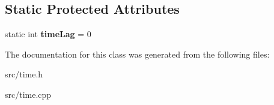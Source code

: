 \subsection*{Static Protected Attributes}
\begin{DoxyCompactItemize}
\item 
\hypertarget{classstb_1_1Date_a8631113e802fb9bbff1aedaa23ca52db}{static int {\bfseries time\+Lag} = 0}\label{classstb_1_1Date_a8631113e802fb9bbff1aedaa23ca52db}

\end{DoxyCompactItemize}


The documentation for this class was generated from the following files\+:\begin{DoxyCompactItemize}
\item 
src/time.\+h\item 
src/time.\+cpp\end{DoxyCompactItemize}
